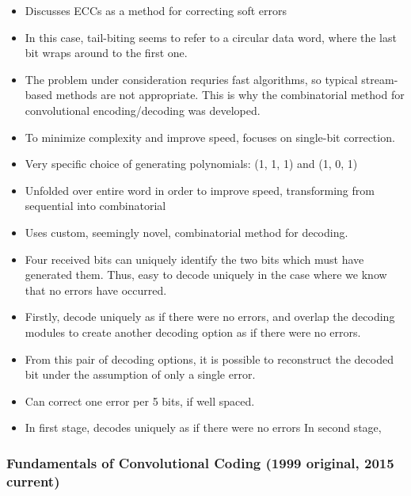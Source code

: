 \documentclass{article}
\begin{document}
\begin{itemize}
\item Discusses ECCs as a method for correcting soft errors

\item In this case, tail-biting seems to refer to a circular data word, where
the last bit wraps around to the first one.

\item The problem under consideration requries fast algorithms, so typical
stream-based methods are not appropriate. This is why the combinatorial
method for convolutional encoding/decoding was developed.

\item To minimize complexity and improve speed, focuses on single-bit
correction.

\item Very specific choice of generating polynomials: (1, 1, 1) and (1, 0, 1)

\item Unfolded over entire word in order to improve speed, transforming from
sequential into combinatorial

\item Uses custom, seemingly novel, combinatorial method for decoding.

\item Four received bits can uniquely identify the two bits which must have
generated them. Thus, easy to decode uniquely in the case where we know
that no errors have occurred.

\item Firstly, decode uniquely as if there were no errors, and overlap the
decoding modules to create another decoding option as if there were no
errors.

\item From this pair of decoding options, it is possible to reconstruct the
decoded bit under the assumption of only a single error.

\item Can correct one error per 5 bits, if well spaced.

\item In first stage, decodes uniquely as if there were no errors
In second stage,
\end{itemize}

\subsubsection{Fundamentals of Convolutional Coding (1999 original, 2015 current)}
\end{document}
